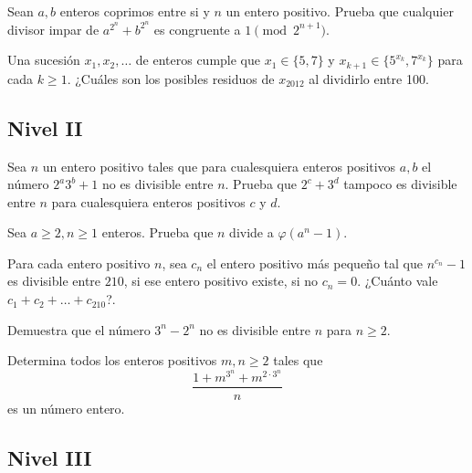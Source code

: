 \documentclass[11pt]{scrartcl}
\newcommand{\thmdifficulty}{0}
\newcommand{\problemdiff}[1]{\renewcommand{\thmdifficulty}{#1}}
\begin{document}
\problemdiff{3}
\begin{problem}
    Sean $a,b$ enteros coprimos entre si y $n$ un entero positivo. Prueba que cualquier divisor impar de $a^{2^n}+b^{2^n}$ es congruente a $1 \pmod 2^{n+1}$.
\end{problem}

\problemdiff{3}
\begin{problem}
    Una sucesión $x_1,x_2,\ldots$ de enteros cumple que $x_1 \in \{5,7\}$ y $x_{k+1}\in \{5^{x_k}, 7^{x_k}\}$ para cada $k \geq 1$. ¿Cuáles son los posibles residuos de $x_{2012}$ al dividirlo entre 100.
\end{problem}

\subsection{Nivel II}
\problemdiff{4}
\begin{problem}
    Sea $n$ un entero positivo tales que para cualesquiera enteros positivos $a,b$ el número $2^{a}3^b+1$ no es divisible entre $n$. Prueba que $2^c+3^d$ tampoco es divisible entre $n$ para cualesquiera enteros positivos $c$ y $d$.
\end{problem}

\problemdiff{4}
\begin{problem}
    Sea $a\geq 2, n \geq 1$ enteros. Prueba que $n$ divide a $\varphi(a^n-1)$.
\end{problem}


\problemdiff{4}
\begin{problem}
    Para cada entero positivo $n$, sea $c_n$ el entero positivo más pequeño tal que $n^{c_n}-1$ es divisible entre $210$, si ese entero positivo existe, si no $c_n=0$. ¿Cuánto vale $c_1+c_2+\ldots+c_{210}$?.
\end{problem}


\problemdiff{4}
\begin{problem}
    Demuestra que el número $3^n-2^n$ no es divisible entre $n$ para $n \geq 2$.
\end{problem}

\problemdiff{4.5}
\begin{problem}
    Determina todos los enteros positivos $m,n \geq 2$ tales que 
    \[\frac{1+m^{3^n}+m^{2\cdot 3^{n}}}{n}\]
    es un número entero.
\end{problem}

\subsection{Nivel III}
\end{document}
